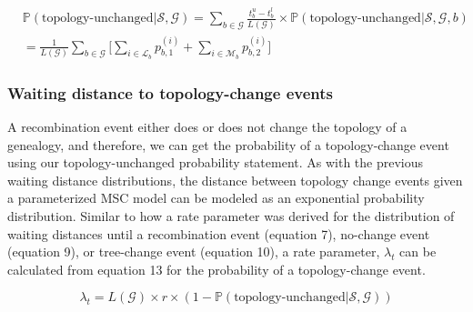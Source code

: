\documentclass[11pt]{article}
\begin{document}
\begin{equation}
\begin{aligned}
	&\mathbb{P}(\textrm{topology-unchanged} | \mathcal{S},\mathcal{G})
	= \sum_{b \in \mathcal{G}}\frac{t_b^u - t_b^l}{L(\mathcal{G})} 
	\times 
	\mathbb{P}(\textrm{topology-unchanged} | \mathcal{S},\mathcal{G},b)
	\\
	&
	= \frac{1}{L(\mathcal{G})} \sum_{b \in \mathcal{G}}
	\bigg[ 
		\sum_{i \in \mathcal{L}_b} p_{b,1}^{(i)} +
		\sum_{i \in \mathcal{M}_b} p_{b,2}^{(i)}
	\bigg]
\end{aligned}
\end{equation}

\subsubsection{Waiting distance to topology-change events}
A recombination event either does or does not change the topology
of a genealogy, and therefore, we can get the probability of a 
topology-change event using our topology-unchanged probability statement.
As with the previous waiting distance distributions, the distance between
topology change events given a parameterized MSC model can be 
modeled as an exponential probability distribution. 
Similar to how a rate parameter was derived for the distribution 
of waiting distances until a recombination event (equation 7), 
no-change event (equation 9), or tree-change event (equation 10), 
a rate parameter, $\lambda_t$ can be calculated from equation 13 for 
the probability of a topology-change event. 

\begin{equation}
	\lambda_{t} = 
	L(\mathcal{G}) \times r \times 
	(1 - \mathbb{P}(\text{topology-unchanged} | \mathcal{S},\mathcal{G}))
\end{equation}
\end{document}
